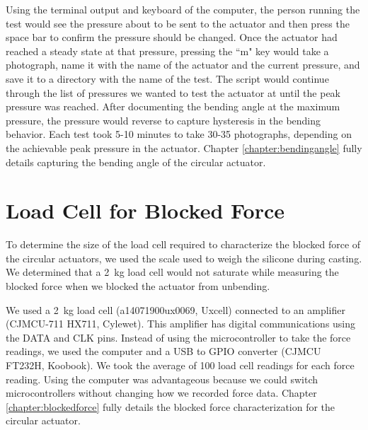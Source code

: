 Using the terminal output and keyboard of the computer, the person running the test would see the pressure about to be sent to the actuator and then press the space bar to confirm the pressure should be changed. Once the actuator had reached a steady state at that pressure, pressing the ``m" key would take a photograph, name it with the name of the actuator and the current pressure, and save it to a directory with the name of the test. The script would continue through the list of pressures we wanted to test the actuator at until the peak pressure was reached. After documenting the bending angle at the maximum pressure, the pressure would reverse to capture hysteresis in the bending behavior. Each test took 5-10 minutes to take 30-35 photographs, depending on the achievable peak pressure in the actuator. Chapter \ref{chapter:bendingangle} fully details capturing the bending angle of the circular actuator. 

\section{Load Cell for Blocked Force}

To determine the size of the load cell required to characterize the blocked force of the circular actuators, we used the scale used to weigh the silicone during casting. We determined that a 2~kg load cell would not saturate while measuring the blocked force when we blocked the actuator from unbending. 

We used a 2~kg load cell (a14071900ux0069, Uxcell) connected to an amplifier (CJMCU-711 HX711, Cylewet). This amplifier has digital communications using the DATA and CLK pins. Instead of using the microcontroller to take the force readings, we used the computer and a USB to GPIO converter (CJMCU FT232H, Koobook). We took the average of 100 load cell readings for each force reading. Using the computer was advantageous because we could switch microcontrollers without changing how we recorded force data. Chapter \ref{chapter:blockedforce} fully details the blocked force characterization for the circular actuator. 




